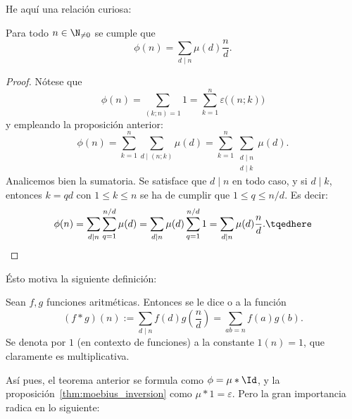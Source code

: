\documentclass[teoria-numeros.tex]{subfiles}
\begin{document}
He aquí una relación curiosa:
\begin{thm}
	Para todo $n\in\N_{\ne 0}$ se cumple que
	$$ \phi(n) = \sum_{d\mid n} \mu(d) \frac{n}{d}. $$
\end{thm}
\begin{proof}
	Nótese que
	$$ \phi(n) = \sum_{(k; n) = 1} 1 = \sum_{k=1}^n \varepsilon\big( (n; k) \big) $$
	y empleando la proposición anterior:
	$$ \phi(n) = \sum_{k=1}^n \sum_{d \mid (n; k)} \mu(d) = \sum_{k=1}^n \sum_{\substack{ d\mid n \\ d\mid k }} \mu(d). $$
	Analicemos bien la sumatoria.
	Se satisface que $d\mid n$ en todo caso, y si $d\mid k$, entonces $k = qd$ con $1\le k \le n$ se ha de cumplir que $1 \le q \le n/d$.
	Es decir:
	\begin{equation}
		\phi(n) = \sum_{d\mid n} \sum_{q=1}^{n/d} \mu(d) = \sum_{d\mid n} \mu(d) \sum_{q=1}^{n/d} 1 = \sum_{d\mid n} \mu(d) \frac{n}{d}. \tqedhere
	\end{equation}
\end{proof}

Ésto motiva la siguiente definición:
\begin{mydefi}
	Sean $f, g$ funciones aritméticas.
	Entonces se le dice  o  a la función
	$$ (f * g)(n) := \sum_{d\mid n} f(d) g\left( \frac{n}{d} \right) = \sum_{ab = n} f(a)g(b). $$
	Se denota por $1$ (en contexto de funciones) a la constante $1(n) = 1$, que claramente es multiplicativa.
\end{mydefi}
Así pues, el teorema anterior se formula como $\phi = \mu * \Id$, y la proposición~\ref{thm:moebius_inversion} como $\mu * 1 = \varepsilon$.
Pero la gran importancia radica en lo siguiente:
\end{document}
